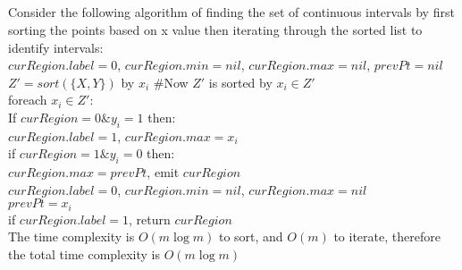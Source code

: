 \documentclass[11pt, oneside]{article}   	%
\begin{document}
\subsection{}
Consider the following algorithm of finding the set of continuous intervals by first sorting the points based on x value then iterating through the sorted list to identify intervals:\\
\indent $curRegion.label=0$, $curRegion.min=nil$, $curRegion.max=nil$, $prevPt = nil$\\ 
\indent $Z'=sort(\{X,Y\})$ by $x_i$ \#Now $Z'$ is sorted by $x_i\in Z'$\\
\indent foreach $x_i\in Z'$:\\
\indent\indent If $curRegion=0\&y_i=1$ then:\\
\indent\indent\indent $curRegion.label=1$, $curRegion.max=x_i$\\
\indent\indent if $curRegion=1\&y_i=0$ then:\\
\indent\indent\indent $curRegion.max=prevPt$, emit $curRegion$\\
\indent\indent\indent $curRegion.label=0$, $curRegion.min=nil$, $curRegion.max=nil$\\
\indent\indent $prevPt = x_i$\\
\indent if $curRegion.label=1$, return $curRegion$\\ 

\indent The time complexity is $O(m\log m)$ to sort, and $O(m)$ to iterate, therefore the total time complexity is $O(m\log m)$\\
\end{document}
